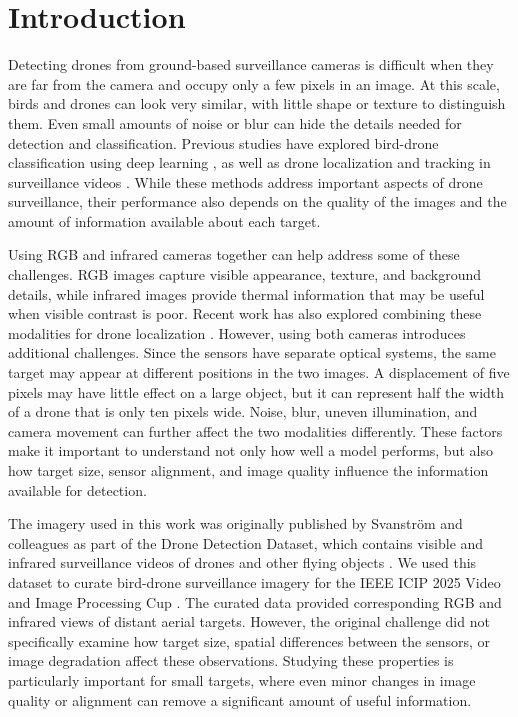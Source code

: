 \documentclass[10pt]{article}
\begin{document}
\section{Introduction}

Detecting drones from ground-based surveillance cameras is difficult when they are far from the camera and occupy only a few pixels in an image. At this scale, birds and drones can look very similar, with little shape or texture to distinguish them. Even small amounts of noise or blur can hide the details needed for detection and classification. Previous studies have explored bird-drone classification using deep learning \citep{selvi2022deep}, as well as drone localization and tracking in surveillance videos \citep{10193217,10328384}. While these methods address important aspects of drone surveillance, their performance also depends on the quality of the images and the amount of information available about each target.

Using RGB and infrared cameras together can help address some of these challenges. RGB images capture visible appearance, texture, and background details, while infrared images provide thermal information that may be useful when visible contrast is poor. Recent work has also explored combining these modalities for drone localization \citep{11700652}. However, using both cameras introduces additional challenges. Since the sensors have separate optical systems, the same target may appear at different positions in the two images. A displacement of five pixels may have little effect on a large object, but it can represent half the width of a drone that is only ten pixels wide. Noise, blur, uneven illumination, and camera movement can further affect the two modalities differently. These factors make it important to understand not only how well a model performs, but also how target size, sensor alignment, and image quality influence the information available for detection.

The imagery used in this work was originally published by Svanstr\"om and colleagues as part of the Drone Detection Dataset, which contains visible and infrared surveillance videos of drones and other flying objects \citep{svanstrom2021multisensor,svanstrom2020repository}. We used this dataset to curate bird-drone surveillance imagery for the IEEE ICIP 2025 Video and Image Processing Cup \citep{ieeevipcup2025}. The curated data provided corresponding RGB and infrared views of distant aerial targets. However, the original challenge did not specifically examine how target size, spatial differences between the sensors, or image degradation affect these observations. Studying these properties is particularly important for small targets, where even minor changes in image quality or alignment can remove a significant amount of useful information.
\end{document}
